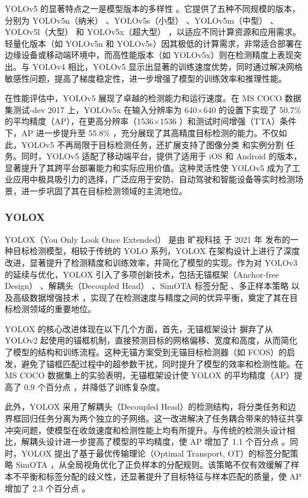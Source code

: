 \documentclass[11pt,twocolumn]{ctexart}
\begin{document}
YOLOv5 的显著特点之一是模型版本的多样性 。它提供了五种不同规模的版本，分别为 YOLOv5n（纳米） 、YOLOv5s（小型） 、YOLOv5m（中型） 、YOLOv5l（大型） 和 YOLOv5x（超大型） ，以适应不同计算资源和应用需求。轻量化版本（如 YOLOv5n 和 YOLOv5s）因其极低的计算需求，非常适合部署在边缘设备或移动端环境中，而高性能版本（如 YOLOv5x）则在检测精度上表现突出。与 YOLOv4 相比，YOLOv5 显示出显著的训练速度优势，同时通过解决网格敏感性问题，提高了梯度稳定性，进一步增强了模型的训练效率和推理性能。

在性能评估中，YOLOv5 展现了卓越的检测能力和运行速度。在 MS COCO 数据集测试-dev 2017 上，YOLOv5x 在输入分辨率为 640×640 的设置下实现了 50.7\% 的平均精度（AP），在更高分辨率（1536×1536 ）和测试时间增强（TTA）条件下，AP 进一步提升至 55.8\% ，充分展现了其高精度目标检测的能力。不仅如此，YOLOv5 不再局限于目标检测任务，还扩展支持了图像分类 和实例分割 任务。同时，YOLOv5 适配了移动端平台，提供了适用于 iOS 和 Android 的版本，显著提升了其跨平台部署能力和实际应用价值。这种灵活性使 YOLOv5 成为了工业应用中极具吸引力的选择，广泛应用于安防、自动驾驶和智能设备等实时检测场景，进一步巩固了其在目标检测领域的主流地位。
\subsubsection{YOLOX}
YOLOX（You Only Look Once Extended） 是由 旷视科技 于 2021 年 发布的一种目标检测模型，相较于传统的 YOLO 系列，YOLOX 在架构设计上进行了深度改进，显著提升了检测精度和训练效率，并简化了模型的实现。作为对 YOLOv3 的延续与优化，YOLOX 引入了多项创新技术，包括无锚框架（Anchor-free Design） 、解耦头（Decoupled Head） 、SimOTA 标签分配 、多正样本策略 以及高级数据增强技术 ，实现了在检测速度与精度之间的优异平衡，奠定了其在目标检测领域的重要地位。

YOLOX 的核心改进体现在以下几个方面，首先，无锚框架设计 摒弃了从 YOLOv2 起使用的锚框机制，直接预测目标的网格偏移、宽度和高度，从而简化了模型的结构和训练流程。这种无锚方案受到无锚目标检测器（如 FCOS）的启发，避免了锚框匹配过程中的超参数干扰，同时提升了模型的效率和检测性能。在 MS COCO 数据集上的实验表明，无锚框架设计使 YOLOX 的平均精度（AP）提高了 0.9 个百分点 ，并降低了训练复杂度。

此外，YOLOX 采用了解耦头（Decoupled Head）的检测结构，将分类任务和边界框回归任务分离为两个独立的子网络。这一改进解决了任务耦合带来的特征共享冲突问题，使模型在收敛速度和检测性能上均有所提升。与传统的检测头设计相比，解耦头设计进一步提高了模型的平均精度，使 AP 增加了 1.1 个百分点 。同时，YOLOX 提出了基于最优传输理论（Optimal Transport, OT）的标签分配策略 SimOTA ，从全局视角优化了正负样本的分配规则。该策略不仅有效缓解了样本不平衡和标签分配的歧义性，还显著提升了目标特征与样本匹配的质量，使 AP 增加了 2.3 个百分点 。
\end{document}

